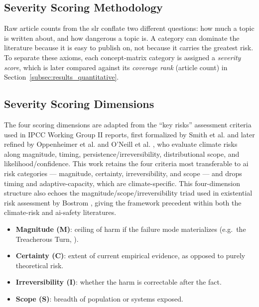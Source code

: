 \begin{toreview}

	\section{Severity Scoring Methodology}\label{sec:severity_scoring_methodology}

	Raw article counts from the \gls{slr} conflate two different questions: how much a topic is written about, and how dangerous a topic is. A category can dominate the literature because it is easy to publish on, not because it carries the greatest risk. To separate these axioms, each concept-matrix category is assigned a \emph{severity score}, which is later compared against its \emph{coverage rank} (article count) in Section~\ref{subsec:results_quantitative}.

	\subsection*{Severity Scoring Dimensions}

	The four scoring dimensions are adapted from the ``key risks'' assessment criteria used in IPCC Working Group II reports, first formalized by Smith et al. \cite{smith2009assessing} and later refined by Oppenheimer et al. \cite{oppenheimer2014emergent} and O'Neill et al. \cite{oneill2017ipcc}, who evaluate climate risks along magnitude, timing, persistence/irreversibility, distributional scope, and likelihood/confidence. This work retains the four criteria most transferable to \gls{ai} risk categories --- magnitude, certainty, irreversibility, and scope --- and drops timing and adaptive-capacity, which are climate-specific. This four-dimension structure also echoes the magnitude/scope/irreversibility triad used in existential risk assessment by Bostrom \cite{bostrom2013existential}, giving the framework precedent within both the climate-risk and \gls{ai}-safety literatures.

	\begin{itemize}
		\item \textbf{Magnitude (M)}: ceiling of harm if the failure mode materializes (e.g.\ the Treacherous Turn, \cite{bostrom2014superintelligence}).
		\item \textbf{Certainty (C)}: extent of current empirical evidence, as opposed to purely theoretical risk.
		\item \textbf{Irreversibility (I)}: whether the harm is correctable after the fact.
		\item \textbf{Scope (S)}: breadth of population or systems exposed.
	\end{itemize}


\end{toreview}
